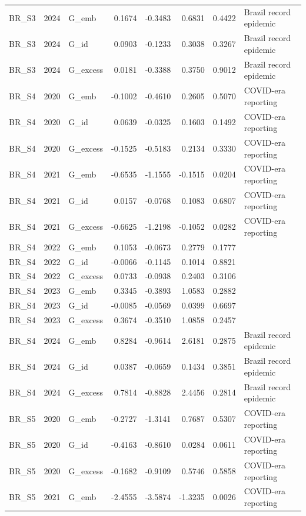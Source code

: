 \begin{tabular}{lllrrrrl}
BR\_S3 & 2024 & G\_emb & 0.1674 & -0.3483 & 0.6831 & 0.4422 & Brazil record epidemic \\
BR\_S3 & 2024 & G\_id & 0.0903 & -0.1233 & 0.3038 & 0.3267 & Brazil record epidemic \\
BR\_S3 & 2024 & G\_excess & 0.0181 & -0.3388 & 0.3750 & 0.9012 & Brazil record epidemic \\
BR\_S4 & 2020 & G\_emb & -0.1002 & -0.4610 & 0.2605 & 0.5070 & COVID-era reporting \\
BR\_S4 & 2020 & G\_id & 0.0639 & -0.0325 & 0.1603 & 0.1492 & COVID-era reporting \\
BR\_S4 & 2020 & G\_excess & -0.1525 & -0.5183 & 0.2134 & 0.3330 & COVID-era reporting \\
BR\_S4 & 2021 & G\_emb & -0.6535 & -1.1555 & -0.1515 & 0.0204 & COVID-era reporting \\
BR\_S4 & 2021 & G\_id & 0.0157 & -0.0768 & 0.1083 & 0.6807 & COVID-era reporting \\
BR\_S4 & 2021 & G\_excess & -0.6625 & -1.2198 & -0.1052 & 0.0282 & COVID-era reporting \\
BR\_S4 & 2022 & G\_emb & 0.1053 & -0.0673 & 0.2779 & 0.1777 &  \\
BR\_S4 & 2022 & G\_id & -0.0066 & -0.1145 & 0.1014 & 0.8821 &  \\
BR\_S4 & 2022 & G\_excess & 0.0733 & -0.0938 & 0.2403 & 0.3106 &  \\
BR\_S4 & 2023 & G\_emb & 0.3345 & -0.3893 & 1.0583 & 0.2882 &  \\
BR\_S4 & 2023 & G\_id & -0.0085 & -0.0569 & 0.0399 & 0.6697 &  \\
BR\_S4 & 2023 & G\_excess & 0.3674 & -0.3510 & 1.0858 & 0.2457 &  \\
BR\_S4 & 2024 & G\_emb & 0.8284 & -0.9614 & 2.6181 & 0.2875 & Brazil record epidemic \\
BR\_S4 & 2024 & G\_id & 0.0387 & -0.0659 & 0.1434 & 0.3851 & Brazil record epidemic \\
BR\_S4 & 2024 & G\_excess & 0.7814 & -0.8828 & 2.4456 & 0.2814 & Brazil record epidemic \\
BR\_S5 & 2020 & G\_emb & -0.2727 & -1.3141 & 0.7687 & 0.5307 & COVID-era reporting \\
BR\_S5 & 2020 & G\_id & -0.4163 & -0.8610 & 0.0284 & 0.0611 & COVID-era reporting \\
BR\_S5 & 2020 & G\_excess & -0.1682 & -0.9109 & 0.5746 & 0.5858 & COVID-era reporting \\
BR\_S5 & 2021 & G\_emb & -2.4555 & -3.5874 & -1.3235 & 0.0026 & COVID-era reporting \\

\end{tabular}
